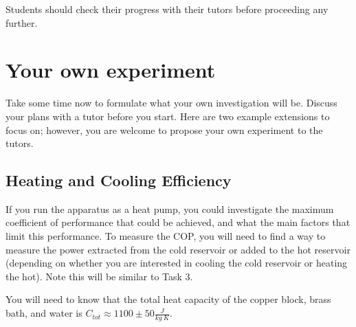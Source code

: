 \documentclass[
  letterpaper,
  DIV=11,
  numbers=noendperiod]{scrreprt}
\begin{document}
\begin{tcolorbox}[enhanced jigsaw, toprule=.15mm, coltitle=black, bottomrule=.15mm, colbacktitle=quarto-callout-warning-color!10!white, opacitybacktitle=0.6, titlerule=0mm, colframe=quarto-callout-warning-color-frame, title=\textcolor{quarto-callout-warning-color}{\faExclamationTriangle}\hspace{0.5em}{Note}, leftrule=.75mm, bottomtitle=1mm, breakable, opacityback=0, arc=.35mm, left=2mm, colback=white, rightrule=.15mm, toptitle=1mm]

Students should check their progress with their tutors before proceeding
any further.

\end{tcolorbox}


\hypertarget{your-own-experiment}{%
\chapter{Your own experiment}\label{your-own-experiment}}

Take some time now to formulate what your own investigation will be.
Discuss your plans with a tutor before you start. Here are two example
extensions to focus on; however, you are welcome to propose your own
experiment to the tutors.

\hypertarget{heating-and-cooling-efficiency}{%
\section{Heating and Cooling
Efficiency}\label{heating-and-cooling-efficiency}}

If you run the apparatus as a heat pump, you could investigate the
maximum coefficient of performance that could be achieved, and what the
main factors that limit this performance. To measure the COP, you will
need to find a way to measure the power extracted from the cold
reservoir or added to the hot reservoir (depending on whether you are
interested in cooling the cold reservoir or heating the hot). Note this
will be similar to Task 3.

You will need to know that the total heat capacity of the copper block,
brass bath, and water is \(C_{tot} \approx 1100 \pm 50\frac{J}{kg\ K}\).
\end{document}
